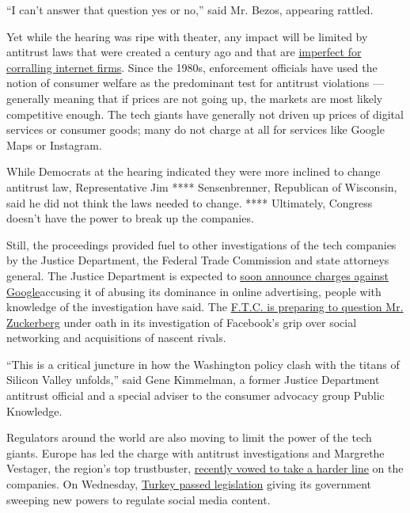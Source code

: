 ``I can't answer that question yes or no,'' said Mr. Bezos, appearing
rattled.

Yet while the hearing was ripe with theater, any impact will be limited
by antitrust laws that were created a century ago and that are
\href{https://www.nytimes3xbfgragh.onion/2018/09/07/technology/monopoly-antitrust-lina-khan-amazon.html}{imperfect
for corralling internet firms}. Since the 1980s, enforcement officials
have used the notion of consumer welfare as the predominant test for
antitrust violations --- generally meaning that if prices are not going
up, the markets are most likely competitive enough. The tech giants have
generally not driven up prices of digital services or consumer goods;
many do not charge at all for services like Google Maps or Instagram.

While Democrats at the hearing indicated they were more inclined to
change antitrust law, Representative Jim **** Sensenbrenner, Republican
of Wisconsin, said he did not think the laws needed to change. ****
Ultimately, Congress doesn't have the power to break up the companies.

Still, the proceedings provided fuel to other investigations of the tech
companies by the Justice Department, the Federal Trade Commission and
state attorneys general. The Justice Department is expected to
\href{https://www.nytimes3xbfgragh.onion/2020/06/25/technology/barr-google-investigation.html}{soon
announce charges against Google}accusing it of abusing its dominance in
online advertising, people with knowledge of the investigation have
said. The
\href{https://www.nytimes3xbfgragh.onion/2020/07/17/technology/ftc-facebook-investigation.html}{F.T.C.
is preparing to question Mr. Zuckerberg} under oath in its investigation
of Facebook's grip over social networking and acquisitions of nascent
rivals.

``This is a critical juncture in how the Washington policy clash with
the titans of Silicon Valley unfolds,'' said Gene Kimmelman, a former
Justice Department antitrust official and a special adviser to the
consumer advocacy group Public Knowledge.

Regulators around the world are also moving to limit the power of the
tech giants. Europe has led the charge with antitrust investigations and
Margrethe Vestager, the region's top trustbuster,
\href{https://www.nytimes3xbfgragh.onion/2019/11/19/technology/tech-regulator-europe.html}{recently
vowed to take a harder line} on the companies. On Wednesday,
\href{https://www.nytimes3xbfgragh.onion/2020/07/29/world/europe/turkey-social-media-control.html}{Turkey
passed legislation} giving its government sweeping new powers to
regulate social media content.

